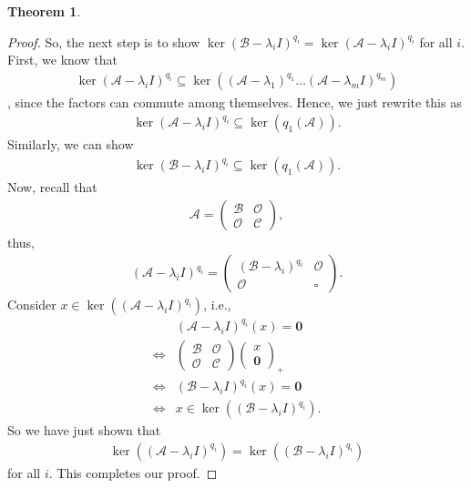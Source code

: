 \documentclass{book}
\theoremstyle{definition}
\newtheorem{thm}{Theorem}[section]
\newcommand{\A}{\mathcal{A}}
\begin{document}
\begin{thm}
\begin{proof}
		So, the next step is to show $\ker(\mathcal{B} - \lambda_i I)^{q_i} = \ker(\A - \lambda_i I)^{q_i}$ for all $i$. First, we know that
		\begin{align*}
		\ker(\A - \lambda_i I)^{q_i} \subseteq \ker\left( (\A - \lambda_1)^{q_1}\dots (\A - \lambda_m I)^{q_m} \right)
		\end{align*},
		since the factors can commute among themselves. Hence, we just rewrite this as
		\begin{align*}
		\ker(\A - \lambda_i I)^{q_i} \subseteq \ker(q_1(\A)).
		\end{align*}
		Similarly, we can show 
		\begin{align*}
		\ker(\mathcal{B} - \lambda_i I)^{q_i} \subseteq \ker(q_1(\A)).
		\end{align*}
		Now, recall that 
		\begin{align*}
		\A = \begin{pmatrix}
		\mathcal{B} & \mathcal{O}\\
		\mathcal{O} & \mathcal{C}
		\end{pmatrix},
		\end{align*}
		thus,
		\begin{align*}
		(\A - \lambda_i I)^{q_i} = \begin{pmatrix}
		(\mathcal{B} - \lambda_i)^{q_i} & \mathcal{O}\\
		\mathcal{O} & \square
		\end{pmatrix}.
		\end{align*}
		Consider $x \in \ker\left((\A - \lambda_i I)^{q_i}\right)$, i.e., 
		\begin{align*}
		&(\A - \lambda_i I)^{q_i}(x) = \mathbf{0}\\
		\iff &\begin{pmatrix}
		\mathcal{B} & \mathcal{O}\\
		\mathcal{O} & \mathcal{C}
		\end{pmatrix}\begin{pmatrix}
		x\\\mathbf{0}
		\end{pmatrix}_+\\
		\iff &(\mathcal{B} - \lambda_i I)^{q_i}(x) = \mathbf{0}\\
		\iff &x \in \ker\left( (\mathcal{B} - \lambda_i I)^{q_i} \right).
		\end{align*}
		So we have just shown that 
		\begin{align*}
		\ker\left( (\A - \lambda_i I)^{q_i} \right) = \ker\left( (\mathcal{B} - \lambda_i I)^{q_i}\right)
		\end{align*}
		for all $i$. This completes our proof. 
	\end{proof}
\end{thm}
\end{document}
